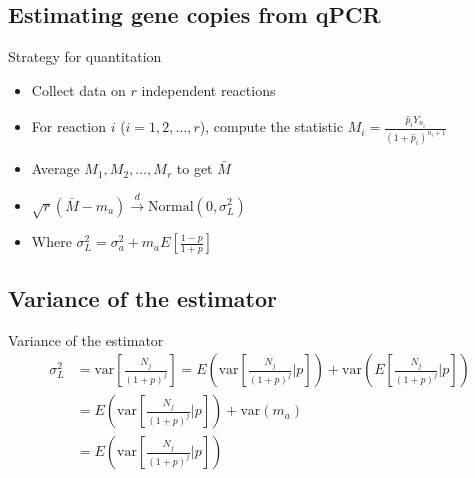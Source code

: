 \documentclass{beamer}
\begin{document}
\subsection{Estimating gene copies from qPCR}


\begin{frame}{Strategy for quantitation}
  \begin{itemize}
    \item Collect data on $r$ independent reactions
    \vspace{3mm}
    \item For reaction $i$ ($i=1, 2, \dots, r$), compute the statistic $M_i = \frac{\hat{p}_i Y_{n_i}}{(1+\hat{p}_i)^{n_i+1}}$
    \vspace{3mm}
    \item Average $M_1, M_2, \dots, M_r$ to get $\bar{M}$
    \vspace{3mm}
    \item $\sqrt{r}(\bar{M} - m_a) \stackrel{d}{\to} \text{Normal}(0,\sigma^2_L)$
    \vspace{3mm}
    \item Where $\sigma^2_L = \sigma^2_a + m_a E[\frac{1-p}{1+p}]$
  \end{itemize}
\end{frame}


\subsection{Variance of the estimator}


\begin{frame}{Variance of the estimator}
\begin{align*}
\sigma^2_L &= \text{var}[\frac{N_j}{(1+p)^j}] = E(\text{var}[\frac{N_j}{(1+p)^j}|p]) + \text{var}(E[\frac{N_j}{(1+p)^j}|p])\\
&= E(\text{var}[\frac{N_j}{(1+p)^j}|p])  + \text{var}(m_a)\\
&= E(\text{var}[\frac{N_j}{(1+p)^j}|p])
\end{align*}
\end{frame}
\end{document}
